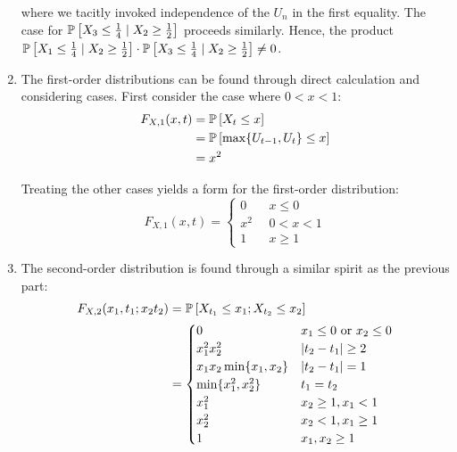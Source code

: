 \documentclass[12pt]{article}%
\begin{document}
\begin{enumerate}
        where we tacitly invoked independence of the $U_{n}$ in the first equality. The case for $\mathbb{P}\left[X_{3} \leq \frac{1}{4} \mid X_{2} \geq \frac{1}{2}\right]$ proceeds similarly. Hence, the product $\mathbb{P}\left[X_{1} \leq \frac{1}{4} \mid X_{2} \geq \frac{1}{2}\right] \cdot \mathbb{P}\left[X_{3} \leq \frac{1}{4} \mid X_{2} \geq \frac{1}{2}\right] \neq 0$.
  \item
        The first-order distributions can be found through direct calculation and considering cases. First consider the case where $0 < x < 1$:
        \begin{align*}
          F_{X,1}(x,t) & = \mathbb{P}\left[X_{t} \leq x\right] \\
                       & = \mathbb{P}\left[\max\{U_{t-1}, U_{t}\} \leq x\right] \\
                  & = x^{2}
        \end{align*}

        Treating the other cases yields a form for the first-order distribution:
        \[ F_{X,1}(x,t) = \begin{cases}
                            0 \quad & x \leq 0 \\
                            x^{2} \; & 0 < x <1 \\
                            1 \quad & x \geq 1
                          \end{cases}\]

  \item
        The second-order distribution is found through a similar spirit as the previous part:
        \begin{align*}
          F_{X,2}(x_{1},t_{1}; x_{2}t_{2}) & = \mathbb{P}\left[X_{t_{1}} \leq x_{1};X_{{t_{2}}} \leq x_{2}\right] \\
                                           & = \begin{cases}
                                                 0 & x_{1} \leq 0 \text{ or } x_{2} \leq 0 \\
                                                 x_{1}^{2}x_{2}^{2} & \abs{t_{2} - t_{1}} \geq 2 \\
                                                 x_{1}x_{2}\min\{x_{1},x_{2}\} & \abs{t_{2} - t_{1}} = 1 \\
                                                 \min\{x_{1}^{2},x_{2}^{2}\} & t_{1} = t_{2} \\
                                                 x_{1}^{2}& x_{2} \geq 1, x_{1} < 1 \\
                                                 x_{2}^{2} & x_{2} < 1, x_{1} \geq 1 \\
                                                 1 & x_{1} , x_{2} \geq 1
                                                \end{cases}
        \end{align*}

\end{enumerate}
\end{document}
